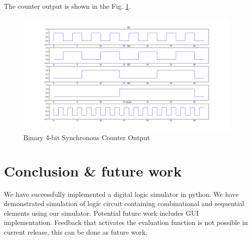 \documentclass[a4paper,12pt]{article}
\begin{document}


The counter output is shown in the Fig. \ref{op}.
\begin{figure}[t]
\centering
\includegraphics[scale=0.35]{counter_op.png}%
\caption{Binary 4-bit Synchronous Counter Output}
\label{op}
\end{figure}

\pagebreak
 \section{Conclusion \& future work}
We have successfully implemented a digital logic simulator in python. We have demonstrated simulation of logic circuit containing combinational and sequential elements using our simulator. Potential future work includes GUI implementation. Feedback that activates the evaluation function is not possible in current release, this can be done as future work.
\end{document}
